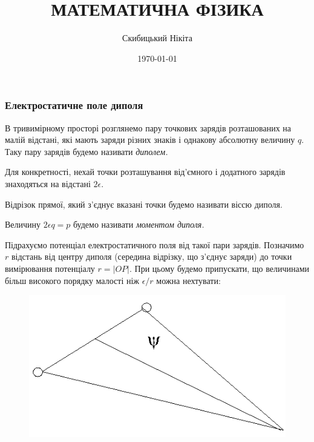 

\title{{\Huge МАТЕМАТИЧНА ФІЗИКА}}
\author{Скибицький Нікіта}
\date{\today}





\tableofcontents

\setcounter{section}{3}
\setcounter{subsection}{5}
\setcounter{subsubsection}{4}
\setcounter{theorem}{14}
\setcounter{equation}{30}

\subsubsection{Електростатичне поле диполя}

\begin{definition}[диполя]
	В тривимірному просторі розглянемо пару точкових зарядів розташованих на малій відстані, які мають заряди різних знаків і однакову абсолютну величину $q$. Таку пару зарядів будемо називати \it{диполем}.
\end{definition}

Для конкретності, нехай точки розташування від'ємного і додатного зарядів знаходяться на відстані $2 \epsilon$. 

\begin{definition}
	Відрізок прямої, який з'єднує вказані точки будемо називати віссю диполя.
\end{definition}

\begin{definition}
	Величину $2 \epsilon q = p$ будемо називати \it{моментом диполя}.
\end{definition}

Підрахуємо потенціал електростатичного поля від такої пари зарядів. Позначимо $r$ відстань від центру диполя (середина відрізку, що з'єднує заряди) до точки вимірювання потенціалу $r = |OP|$. При цьому будемо припускати, що величинами більш високого порядку малості ніж $\epsilon/r$ можна нехтувати:
\begin{figure}[H]
	\centering
	\includegraphics[width=.5\textwidth]{img/13-1.png}
\end{figure}
 
